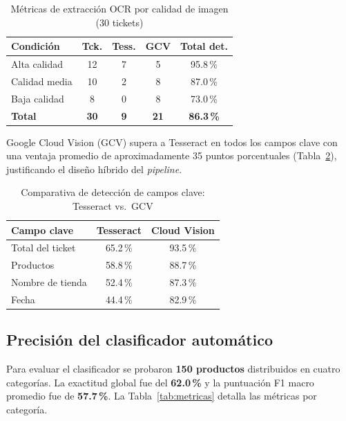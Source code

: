 \documentclass[10pt,twocolumn,letterpaper]{article}
\begin{document}
\begin{table}[H]
  \centering
  \small
  \caption{Métricas de extracción OCR por calidad de imagen (30 tickets)}
  \label{tab:ocr}
  \begin{tabular}{lcccc}
    \toprule
    \textbf{Condición} & \textbf{Tck.} & \textbf{Tess.} & \textbf{GCV} & \textbf{Total det.} \\
    \midrule
    Alta calidad  & 12 &  7 & 5  & 95.8\,\% \\
    Calidad media & 10 &  2 & 8  & 87.0\,\% \\
    Baja calidad  &  8 &  0 & 8  & 73.0\,\% \\
    \midrule
    \textbf{Total} & \textbf{30} & \textbf{9} & \textbf{21} & \textbf{86.3\,\%} \\
    \bottomrule
  \end{tabular}
\end{table}

Google Cloud Vision (GCV) supera a Tesseract en todos los campos clave con una ventaja promedio
de aproximadamente 35 puntos porcentuales (Tabla~\ref{tab:campos}), justificando el diseño
híbrido del \emph{pipeline}.

\begin{table}[H]
  \centering
  \small
  \caption{Comparativa de detección de campos clave: Tesseract vs.\ GCV}
  \label{tab:campos}
  \begin{tabular}{lcc}
    \toprule
    \textbf{Campo clave} & \textbf{Tesseract} & \textbf{Cloud Vision} \\
    \midrule
    Total del ticket & 65.2\,\% & 93.5\,\% \\
    Productos        & 58.8\,\% & 88.7\,\% \\
    Nombre de tienda & 52.4\,\% & 87.3\,\% \\
    Fecha            & 44.4\,\% & 82.9\,\% \\
    \bottomrule
  \end{tabular}
\end{table}

\subsection{Precisión del clasificador automático}

Para evaluar el clasificador se probaron \textbf{150 productos} distribuidos en cuatro categorías.
La exactitud global fue del \textbf{62.0\,\%} y la puntuación F1 macro promedio fue de
\textbf{57.7\,\%}. La Tabla~\ref{tab:metricas} detalla las métricas por categoría.
\end{document}
